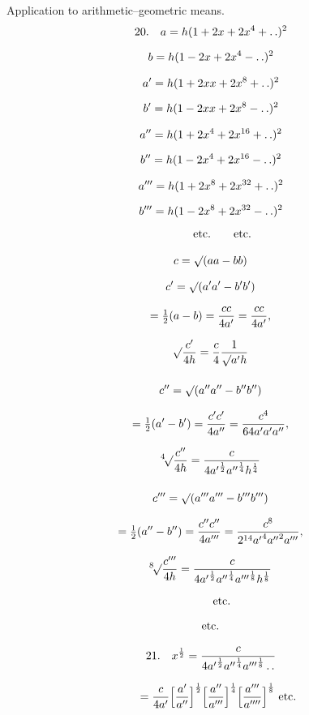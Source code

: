 \begingroup
\renewcommand{\arraystretch}{1.45}

Application to arithmetic–geometric means.
\[
\begin{gathered}
20.\quad a=h(1+2x+2x^4+\mathinner{.\,.})^2\\[6pt]b=h(1-2x+2x^4-\mathinner{.\,.})^2\\[7pt]
a'=h(1+2xx+2x^8+\mathinner{.\,.})^2\\[6pt]b'=h(1-2xx+2x^8-\mathinner{.\,.})^2\\[7pt]
a''=h(1+2x^4+2x^{16}+\mathinner{.\,.})^2\\[6pt]b''=h(1-2x^4+2x^{16}-\mathinner{.\,.})^2\\[7pt]
a'''=h(1+2x^8+2x^{32}+\mathinner{.\,.})^2\\[6pt]b'''=h(1-2x^8+2x^{32}-\mathinner{.\,.})^2\\[5pt]
\qquad\mathrm{etc.}\qquad\mathrm{etc.}
\end{gathered}
\]

\[
\begin{gathered}
c=\surd(aa-bb)\\[8pt]
c'=\surd(a'a'-b'b')\\[7pt]=\tfrac12(a-b)=\dfrac{cc}{4a'}=\dfrac{cc}{4a'},
\\[7pt]\surd\dfrac{c'}{4h}=\dfrac{c}{4}\dfrac{1}{\surd a'h}\\[12pt]
c''=\surd(a''a''-b''b'')\\[7pt]=\tfrac12(a'-b')=\dfrac{c'c'}{4a''}=\dfrac{c^4}{64a'a'a''},
\\[7pt]{}^{4}\!\surd\dfrac{c''}{4h}=\dfrac{c}{4{a'}^{\frac12}{a''}^{\frac14}h^{\frac14}}\\[12pt]
c'''=\surd(a'''a'''-b'''b''')\\[7pt]=\tfrac12(a''-b'')=\dfrac{c''c''}{4a'''}=\dfrac{c^8}{2^{14}{a'}^4{a''}^2a'''},
\\[7pt]{}^{8}\!\surd\dfrac{c'''}{4h}=\dfrac{c}{4{a'}^{\frac12}{a''}^{\frac14}{a'''}^{\frac18}h^{\frac18}}\\[7pt]
\qquad\mathrm{etc.}\\[7pt]\mathrm{etc.}
\end{gathered}
\]

\[
\begin{gathered}21.\quad x^{\frac12}=\frac{c}{4{a'}^{\frac12}{a''}^{\frac14}{a'''}^{\frac18}\mathinner{.\,.}}
\\[8pt]\quad{}=\frac{c}{4a'}\Bigl[\frac{a'}{a''}\Bigr]^{\frac12}
\Bigl[\frac{a''}{a'''}\Bigr]^{\frac14}
\Bigl[\frac{a'''}{a''''}\Bigr]^{\frac18}\ \mathrm{etc.}\end{gathered}
\]

